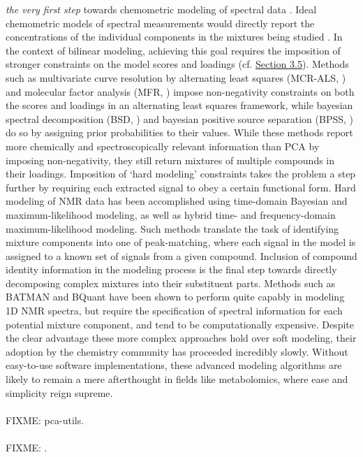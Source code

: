 \begin{doublespace}
\emph{the very first step} towards chemometric modeling of spectral data
\cite{gromski:aca2015}. Ideal chemometric models of spectral measurements
would directly report the concentrations of the individual components in
the mixtures being studied \cite{eads:anchem2004}. In the context of bilinear
modeling, achieving this goal requires the imposition of stronger constraints
on the model scores and loadings (cf. \hyperlink{section.3.5}{Section 3.5}).
Methods such as multivariate curve resolution by alternating least squares
(MCR-ALS, \cite{dejuan:crac2006}) and molecular factor analysis
(MFR, \cite{eads:anchem2004}) impose non-negativity constraints on both
the scores and loadings in an alternating least squares framework, while
bayesian spectral decomposition (BSD, \cite{ochs:jmr1999,stoyanova:anchem2004})
and bayesian positive source separation (BPSS, \cite{moussaoui:ieee2006,
  moussaoui:cils2006}) do so by assigning prior
probabilities to their values. While these methods report more chemically
and spectroscopically relevant information than PCA by imposing non-negativity,
they still return mixtures of multiple compounds in their loadings. Imposition
of `hard modeling' constraints takes the problem a step further by requiring
each extracted signal to obey a certain functional form. Hard modeling of NMR
data has been accomplished using time-domain Bayesian
\cite{bretthorst:jmr1990a,bretthorst:jmr1990b,bretthorst:jmr1990c,
      chylla:jbnmr1993} and maximum-likelihood \cite{chylla:jbnmr1995}
modeling, as well as hybrid time- and frequency-domain maximum-likelihood
\cite{chylla:jbnmr1998,chylla:anchem2011,hu:anchem2011} modeling. Such
methods translate the task of identifying mixture components into one of
peak-matching, where each signal in the model is assigned to a known set
of signals from a given compound. Inclusion of compound identity information
in the modeling process is the final step towards directly decomposing complex
mixtures into their substituent parts. Methods such as BATMAN
\cite{astle:jasa2012,hao:binf2012} and BQuant \cite{zheng:binf2011} have
been shown to perform quite capably in modeling 1D \hnmr{} NMR spectra, but
require the specification of spectral information for each potential mixture
component, and tend to be computationally expensive. Despite the clear
advantage these more complex approaches hold over soft modeling, their
adoption by the chemistry community has proceeded incredibly slowly. Without
easy-to-use software implementations, these advanced modeling algorithms are
likely to remain a mere afterthought in fields like metabolomics, where
ease and simplicity reign supreme.
\\\\
FIXME: pca-utils.
\\\\
FIXME: \npistar{}.
\end{doublespace}




